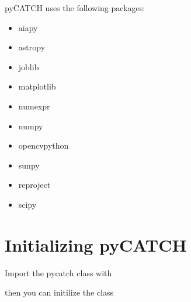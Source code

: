\documentclass[letterpaper,10pt,english]{sphinxmanual}
\begin{document}
\begin{sphinxVerbatim}[commandchars=\\\{\}]
  
\end{sphinxVerbatim}

\sphinxAtStartPar
pyCATCH uses the following packages:
\begin{itemize}
\item {} 
\sphinxAtStartPar
aiapy

\item {} 
\sphinxAtStartPar
astropy

\item {} 
\sphinxAtStartPar
joblib

\item {} 
\sphinxAtStartPar
matplotlib

\item {} 
\sphinxAtStartPar
numexpr

\item {} 
\sphinxAtStartPar
numpy

\item {} 
\sphinxAtStartPar
opencv\sphinxhyphen{}python

\item {} 
\sphinxAtStartPar
sunpy

\item {} 
\sphinxAtStartPar
reproject

\item {} 
\sphinxAtStartPar
scipy

\end{itemize}


\section{Initializing pyCATCH}
\label{\detokenize{getting_started:initializing-pycatch}}
\sphinxAtStartPar
Import the pycatch class with

\begin{sphinxVerbatim}[commandchars=\\\{\}]
   
\end{sphinxVerbatim}

\sphinxAtStartPar
then you can initilize the class

\begin{sphinxVerbatim}[commandchars=\\\{\}]
  
\end{sphinxVerbatim}
\end{document}
